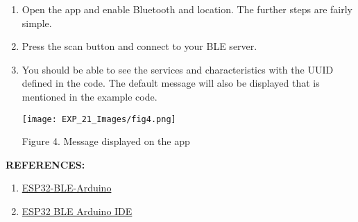 \documentclass[12pt,a4paper]{article}
\begin{document}
\begin{sloppypar}
\begin{justify}
\begin{enumerate}
\item Open the app and enable Bluetooth and location. The further steps are fairly simple.
\item Press the scan button and connect to your BLE server.
\item You should be able to see the services and characteristics with the UUID defined in the code. The default message will also be displayed that is mentioned in the example code.
\begin{center} 
\texttt{[image: EXP\_21\_Images/fig4.png]}
\end{center}
\begin{center} {Figure 4. Message displayed on the app }\end{center}
\end{enumerate}



\textbf{\large REFERENCES:}
\vspace{-6mm}
\begin{enumerate}
\setlength\itemsep{-0.3em}
 \item  \href{https://www.arduino.cc/reference/en/libraries/esp32-ble-arduino/}{ESP32-BLE-Arduino}
\item   \href{https://randomnerdtutorials.com/esp32-bluetooth-low-energy-ble-arduino-ide/}{ESP32 BLE Arduino IDE}
\end{enumerate}
\end{justify}
\end{sloppypar}
\end{document}
